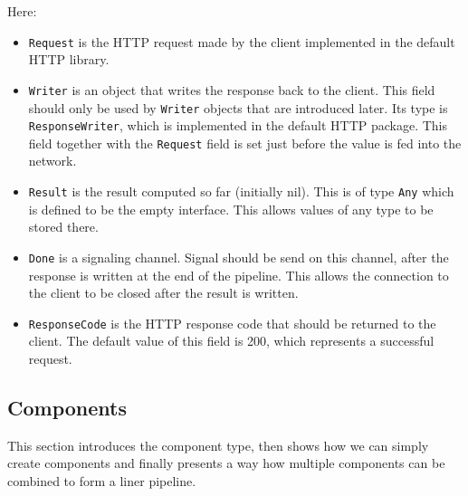 \documentclass[12pt,a4paper]{article}
\begin{document}
Here:
\begin{itemize}
  \item \texttt{Request} is the HTTP request made by the client implemented
        in the default HTTP library.

  \item \texttt{Writer} is an object that writes the response back to the client.
        This field should only be used by \texttt{Writer} objects that are introduced later.
        Its type is \texttt{ResponseWriter}, which is implemented in the default HTTP
        package. This field together with the \texttt{Request} field is set just before
        the value is fed into the network.

  \item \texttt{Result} is the result computed so far (initially nil). This is
        of type \texttt{Any} which is defined to be the empty interface.
        This allows values of any type to be stored there.

  \item \texttt{Done} is a signaling channel. Signal should be send on this channel,
		after the response is written at the end of the pipeline. This
        allows the connection to the client to be closed after the result
        is written.

  \item \texttt{ResponseCode} is the HTTP response code that should be 
        returned to the client. The default value of this field is 200,
        which represents a successful request.
\end{itemize}


\subsection{Components}
This section introduces the component type, then shows how we can simply
create components and finally presents a way how multiple components can
be combined to form a liner pipeline.
\end{document}
